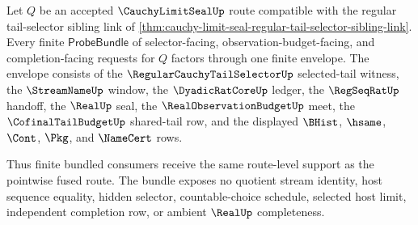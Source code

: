 \begin{theorem}
\label{thm:cauchy-limit-seal-regular-tail-selector-probebundle-coverage}
Let $Q$ be an accepted $\CauchyLimitSealUp$ route compatible with the regular tail-selector sibling link of \autoref{thm:cauchy-limit-seal-regular-tail-selector-sibling-link}. Every finite $\mathsf{ProbeBundle}$ of selector-facing, observation-budget-facing, and completion-facing requests for $Q$ factors through one finite envelope. The envelope consists of the $\RegularCauchyTailSelectorUp$ selected-tail witness, the $\StreamNameUp$ window, the $\DyadicRatCoreUp$ ledger, the $\RegSeqRatUp$ handoff, the $\RealUp$ seal, the $\RealObservationBudgetUp$ meet, the $\CofinalTailBudgetUp$ shared-tail row, and the displayed $\BHist$, $\hsame$, $\Cont$, $\Pkg$, and $\NameCert$ rows.

Thus finite bundled consumers receive the same route-level support as the pointwise fused route. The bundle exposes no quotient stream identity, host sequence equality, hidden selector, countable-choice schedule, selected host limit, independent completion row, or ambient $\RealUp$ completeness.
\end{theorem}
